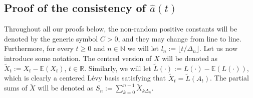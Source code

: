 \documentclass{article}
\theoremstyle{plain}
\theoremstyle{definition}
\theoremstyle{remark}
\newcommand{\Levy}{L\'{e}vy }
\begin{document}
\begin{appendix}
\subsection{Proof of the consistency of $\hat{a}(t)$}\label{Secbasidec}
Throughout all our proofs below, the non-random positive constants will
be denoted by the generic symbol $C>0$, and they may change from
line to line. Furthermore, for every $t\geq0$ and $n\in\mathbb{N}$
we will let $l_{n}:=\lfloor t/\Delta_{n}\rfloor$. Let us now introduce some notation. The centred version of
$X$ will be denoted as $\tilde{X}_{t}:=X_{t}-\mathbb{E}(X_{t})$,
$t\in\mathbb{R}$. Similarly, we will let $\tilde{L}(\cdot):=L(\cdot)-\mathbb{E}(L(\cdot))$,
which is clearly a centered \Levy basis satisfying that $\tilde{X}_{t}=\tilde{L}(A_{t})$.
The partial sums of $\tilde{X}$ will be denoted as $S_{n}:=\sum_{k=0}^{n-1}\tilde{X}_{k\Delta_{n}}$.


\end{appendix}
\end{document}
